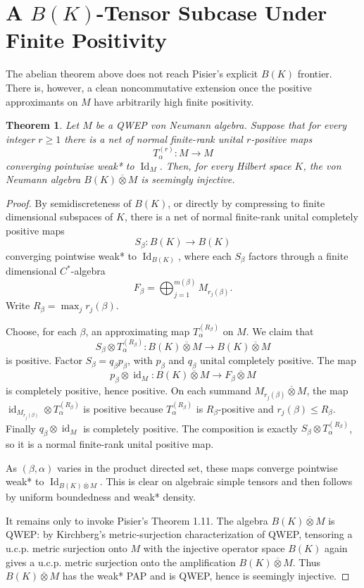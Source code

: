 \documentclass[11pt]{article}
\newtheorem{theorem}{Theorem}
\newcommand{\vN}{von Neumann}
\newcommand{\otv}{\mathbin{\overline{\otimes}}}
\newcommand{\id}{\operatorname{id}}
\begin{document}
\section*{A \(B(K)\)-Tensor Subcase Under Finite Positivity}

The abelian theorem above does not reach Pisier's explicit \(B(K)\) frontier.
There is, however, a clean noncommutative extension once the positive
approximants on \(M\) have arbitrarily high finite positivity.

\begin{theorem}
\label{thm:bk-high-positive}
Let \(M\) be a QWEP \vN{} algebra. Suppose that for every integer \(r\geq 1\)
there is a net of normal finite-rank unital \(r\)-positive maps
\[
  T_{\alpha}^{(r)}:M\to M
\]
converging pointwise weak* to \(\operatorname{Id}_M\). Then, for every Hilbert
space \(K\), the \vN{} algebra \(B(K)\otv M\) is seemingly injective.
\end{theorem}

\begin{proof}
By semidiscreteness of \(B(K)\), or directly by compressing to finite
dimensional subspaces of \(K\), there is a net of normal finite-rank unital
completely positive maps
\[
  S_\beta:B(K)\to B(K)
\]
converging pointwise weak* to \(\operatorname{Id}_{B(K)}\), where each
\(S_\beta\) factors through a finite dimensional \(C^*\)-algebra
\[
  F_\beta=\bigoplus_{j=1}^{m(\beta)}M_{r_j(\beta)}.
\]
Write \(R_\beta=\max_j r_j(\beta)\).

Choose, for each \(\beta\), an approximating map
\(T_\alpha^{(R_\beta)}\) on \(M\). We claim that
\[
  S_\beta\otimes T_\alpha^{(R_\beta)}:
  B(K)\otv M\to B(K)\otv M
\]
is positive. Factor \(S_\beta=q_\beta p_\beta\), with \(p_\beta\) and
\(q_\beta\) unital completely positive. The map
\[
  p_\beta\otimes \id_M:B(K)\otv M\to F_\beta\otv M
\]
is completely positive, hence positive. On each summand
\(M_{r_j(\beta)}\otv M\), the map
\(\id_{M_{r_j(\beta)}}\otimes T_\alpha^{(R_\beta)}\) is positive because
\(T_\alpha^{(R_\beta)}\) is \(R_\beta\)-positive and \(r_j(\beta)\leq
R_\beta\). Finally \(q_\beta\otimes \id_M\) is completely positive. The
composition is exactly \(S_\beta\otimes T_\alpha^{(R_\beta)}\), so it is a
normal finite-rank unital positive map.

As \((\beta,\alpha)\) varies in the product directed set, these maps converge
pointwise weak* to \(\operatorname{Id}_{B(K)\otv M}\). This is clear on
algebraic simple tensors and then follows by uniform boundedness and weak*
density.

It remains only to invoke Pisier's Theorem 1.11. The algebra \(B(K)\otv M\)
is QWEP: by Kirchberg's metric-surjection characterization of QWEP, tensoring
a u.c.p. metric surjection onto \(M\) with the injective operator space
\(B(K)\) again gives a u.c.p. metric surjection onto the amplification
\(B(K)\otv M\). Thus \(B(K)\otv M\) has the weak* PAP and is QWEP, hence is
seemingly injective.
\end{proof}
\end{document}
